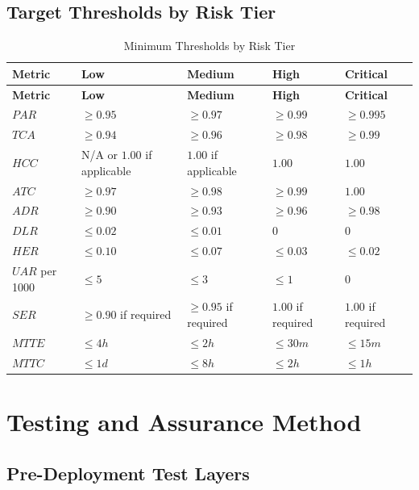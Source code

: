 \documentclass[11pt,a4paper]{article}
\begin{document}
\subsection{Target Thresholds by Risk Tier}

\begin{longtable}{P{0.14\textwidth}P{0.14\textwidth}P{0.14\textwidth}P{0.14\textwidth}P{0.14\textwidth}}
\caption{Minimum Thresholds by Risk Tier} \\
\toprule
\textbf{Metric} & \textbf{Low} & \textbf{Medium} & \textbf{High} & \textbf{Critical} \\
\midrule
\endfirsthead
\toprule
\textbf{Metric} & \textbf{Low} & \textbf{Medium} & \textbf{High} & \textbf{Critical} \\
\midrule
\endhead
\(PAR\) & \(\ge 0.95\) & \(\ge 0.97\) & \(\ge 0.99\) & \(\ge 0.995\) \\
\(TCA\) & \(\ge 0.94\) & \(\ge 0.96\) & \(\ge 0.98\) & \(\ge 0.99\) \\
\(HCC\) & N/A or \(1.00\) if applicable & \(1.00\) if applicable & \(1.00\) & \(1.00\) \\
\(ATC\) & \(\ge 0.97\) & \(\ge 0.98\) & \(\ge 0.99\) & \(1.00\) \\
\(ADR\) & \(\ge 0.90\) & \(\ge 0.93\) & \(\ge 0.96\) & \(\ge 0.98\) \\
\(DLR\) & \(\le 0.02\) & \(\le 0.01\) & \(0\) & \(0\) \\
\(HER\) & \(\le 0.10\) & \(\le 0.07\) & \(\le 0.03\) & \(\le 0.02\) \\
\(UAR\) per 1000 & \(\le 5\) & \(\le 3\) & \(\le 1\) & \(0\) \\
\(SER\) & \(\ge 0.90\) if required & \(\ge 0.95\) if required & \(1.00\) if required & \(1.00\) if required \\
\(MTTE\) & \(\le 4h\) & \(\le 2h\) & \(\le 30m\) & \(\le 15m\) \\
\(MTTC\) & \(\le 1d\) & \(\le 8h\) & \(\le 2h\) & \(\le 1h\) \\
\bottomrule
\end{longtable}

\section{Testing and Assurance Method}

\subsection{Pre-Deployment Test Layers}
\end{document}

